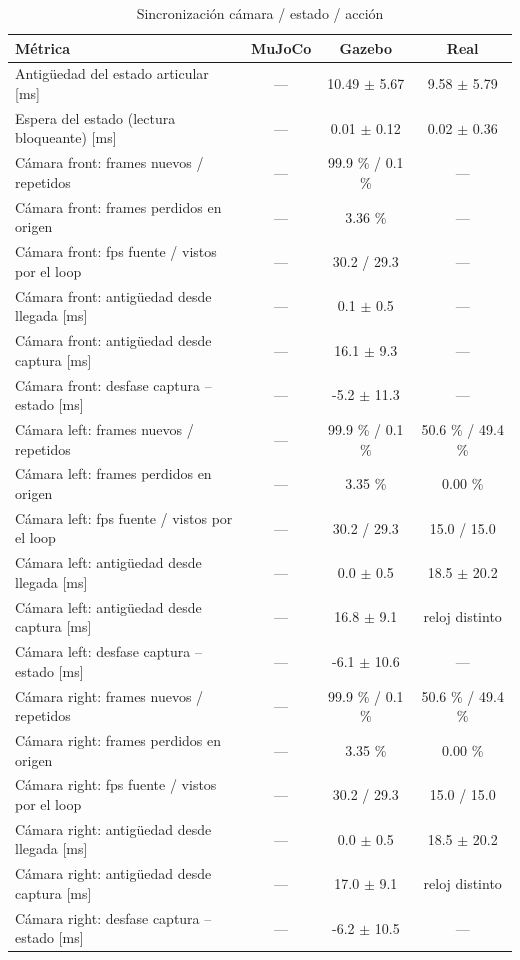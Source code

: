 \begin{table}[htbp]
\centering\small
\caption{Sincronización cámara / estado / acción}
\begin{tabular}{lccc}
\toprule
Métrica & MuJoCo & Gazebo & Real \\
\midrule
Antigüedad del estado articular [ms] & — & 10.49 $\pm$ 5.67 & 9.58 $\pm$ 5.79 \\
Espera del estado (lectura bloqueante) [ms] & — & 0.01 $\pm$ 0.12 & 0.02 $\pm$ 0.36 \\
Cámara front: frames nuevos / repetidos & — & 99.9 \% / 0.1 \% & — \\
Cámara front: frames perdidos en origen & — & 3.36 \% & — \\
Cámara front: fps fuente / vistos por el loop & — & 30.2 / 29.3 & — \\
Cámara front: antigüedad desde llegada [ms] & — & 0.1 $\pm$ 0.5 & — \\
Cámara front: antigüedad desde captura [ms] & — & 16.1 $\pm$ 9.3 & — \\
Cámara front: desfase captura -- estado [ms] & — & -5.2 $\pm$ 11.3 & — \\
Cámara left: frames nuevos / repetidos & — & 99.9 \% / 0.1 \% & 50.6 \% / 49.4 \% \\
Cámara left: frames perdidos en origen & — & 3.35 \% & 0.00 \% \\
Cámara left: fps fuente / vistos por el loop & — & 30.2 / 29.3 & 15.0 / 15.0 \\
Cámara left: antigüedad desde llegada [ms] & — & 0.0 $\pm$ 0.5 & 18.5 $\pm$ 20.2 \\
Cámara left: antigüedad desde captura [ms] & — & 16.8 $\pm$ 9.1 & reloj distinto \\
Cámara left: desfase captura -- estado [ms] & — & -6.1 $\pm$ 10.6 & — \\
Cámara right: frames nuevos / repetidos & — & 99.9 \% / 0.1 \% & 50.6 \% / 49.4 \% \\
Cámara right: frames perdidos en origen & — & 3.35 \% & 0.00 \% \\
Cámara right: fps fuente / vistos por el loop & — & 30.2 / 29.3 & 15.0 / 15.0 \\
Cámara right: antigüedad desde llegada [ms] & — & 0.0 $\pm$ 0.5 & 18.5 $\pm$ 20.2 \\
Cámara right: antigüedad desde captura [ms] & — & 17.0 $\pm$ 9.1 & reloj distinto \\
Cámara right: desfase captura -- estado [ms] & — & -6.2 $\pm$ 10.5 & — \\

\end{tabular}
\end{table}
